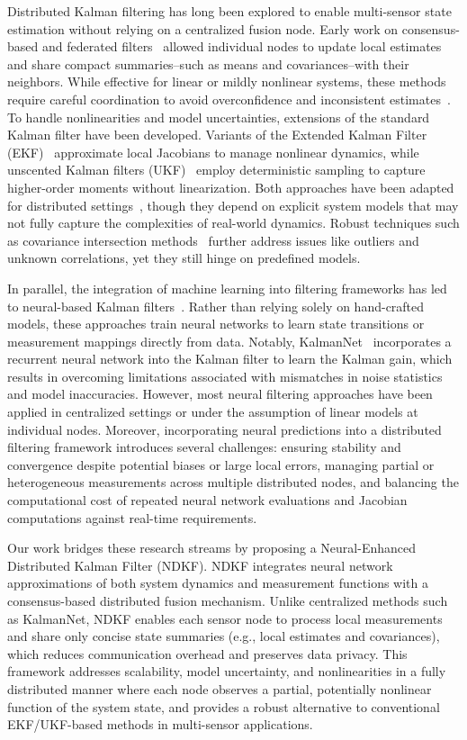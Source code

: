 \documentclass[letterpaper, 10 pt, conference]{ieeeconf}
\begin{document}
Distributed Kalman filtering has long been explored to enable multi-sensor state estimation without relying on a centralized fusion node. Early work on consensus-based and federated filters~\cite{Olfati2005, Olfati2007, Carlson1994} allowed individual nodes to update local estimates and share compact summaries--such as means and covariances--with their neighbors. While effective for linear or mildly nonlinear systems, these methods require careful coordination to avoid overconfidence and inconsistent estimates~\cite{Carli2007}.
To handle nonlinearities and model uncertainties, extensions of the standard Kalman filter have been developed. Variants of the Extended Kalman Filter (EKF)~\cite{Jazwinski2007} approximate local Jacobians to manage nonlinear dynamics, while unscented Kalman filters (UKF)~\cite{Julier2004} employ deterministic sampling to capture higher-order moments without linearization. Both approaches have been adapted for distributed settings~\cite{Battistelli2016, Li2016}, though they depend on explicit system models that may not fully capture the complexities of real-world dynamics. Robust techniques such as covariance intersection methods~\cite{Julier2017,Hu2012} further address issues like outliers and unknown correlations, yet they still hinge on predefined models.

In parallel, the integration of machine learning into filtering frameworks has led to neural-based Kalman filters~\cite{Krishnan2015, Fraccaro2016}. Rather than relying solely on hand-crafted models, these approaches train neural networks to learn state transitions or measurement mappings directly from data. Notably, KalmanNet~\cite{Revach2022} incorporates a recurrent neural network into the Kalman filter to learn the Kalman gain, which results in overcoming limitations associated with mismatches in noise statistics and model inaccuracies. However, most neural filtering approaches have been applied in centralized settings or under the assumption of linear models at individual nodes. Moreover, incorporating neural predictions into a distributed filtering framework introduces several challenges: ensuring stability and convergence despite potential biases or large local errors, managing partial or heterogeneous measurements across multiple distributed nodes, and balancing the computational cost of repeated neural network evaluations and Jacobian computations against real-time requirements.

Our work bridges these research streams by proposing a Neural-Enhanced Distributed Kalman Filter (NDKF). NDKF integrates neural network approximations of both system dynamics and measurement functions with a consensus-based distributed fusion mechanism. Unlike centralized methods such as KalmanNet, NDKF enables each sensor node to process local measurements and share only concise state summaries (e.g., local estimates and covariances), which reduces communication overhead and preserves data privacy. This framework addresses scalability, model uncertainty, and nonlinearities in a fully distributed manner where each node observes a partial, potentially nonlinear function of the system state, and provides a robust alternative to conventional EKF/UKF-based methods in multi-sensor applications.
\end{document}
